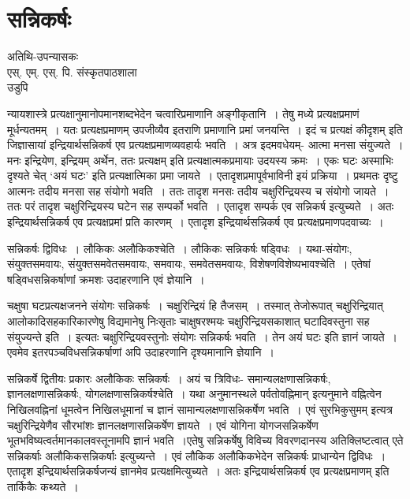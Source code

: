{\fontsize{15}{17}\selectfont
\presetvalues
\chapter{सन्निकर्षः}

\begin{center}
\smallskip
अतिथि-उपन्यासकः\\
एस्. एम्. एस्. पि. संस्कृतपाठशाला\\
उडुपि
\addrule
\end{center} 
न्यायशास्त्रे प्रत्यक्षानुमानोपमानशब्दभेदेन चत्वारिप्रमाणानि अङ्गीकृतानि~। तेषु मध्ये प्रत्यक्ष\-प्रमाणं मूर्धन्यतमम्~। यतः प्रत्यक्षप्रमाणम् उपजीव्यैव इतराणि प्रमाणानि प्रमां जनयन्ति~। इदं च प्रत्यक्षं कीदृशम् इति जिज्ञासायां इन्द्रियार्थसन्निकर्ष एव प्रत्यक्षप्रमाणव्यवहार्यः भवति~। अत्र इदमवधेयम्- आत्मा मनसा संयुज्यते~। मनः इन्द्रियेण, इन्द्रियम् अर्थेन, ततः प्रत्यक्षम् इति प्रत्यक्षात्मकप्रमायाः उदयस्य क्रमः~। एकः घटः अस्माभिः दृश्यते चेत् ‘अयं घटः’ इति प्रत्यक्षात्मिका प्रमा जायते~। एतादृशप्रमापूर्वभाविनी इयं प्रक्रिया~। प्रथमतः दृष्टु आत्मनः तदीय मनसा सह संयोगो भवति~। ततः तादृश मनसः तदीय चक्षुरिन्द्रियस्य च संयोगो जायते~। ततः परं तादृश चक्षुरिन्द्रियस्य घटेन सह सम्पर्को भवति~। एतादृश सम्पर्क एव सन्निकर्ष इत्युच्यते~। अतः इन्द्रियार्थसन्निकर्ष एव प्रत्यक्षप्रमां प्रति कारणम्~। एतादृश इन्द्रियार्थसन्निकर्ष एव प्रत्यक्षप्रमाणपदवाच्यः~। 

सन्निकर्षः द्विविधः~। लौकिकः अलौकिकश्चेति~। लौकिकः सन्निकर्षः षड्विधः~। यथा-संयोगः, संयुक्तसमवायः, संयुक्तसमवेतसमवायः, समवायः, समवेतसमवायः, विशेषण\-विशेष्यभावश्चेति~। एतेषां षड्विधसन्निकर्षाणां क्रमशः उदाहरणानि एवं ज्ञेयानि~। 

चक्षुषा घटप्रत्यक्षजनने संयोगः सन्निकर्षः~। चक्षुरिन्द्रियं हि तैजसम्~। तस्मात् तेजोरूपात् चक्षुरिन्द्रियात् आलोकादिसहकारिकारणेषु विद्यमानेषु निःसृताः चाक्षुषरश्मयः चक्षुरिन्द्रियसकाशात् घटादिवस्तुना सह संयुज्यन्ते इति~। इत्यतः चक्षुरिन्द्रियवस्तुनोः संयोगः सन्निकर्षः भवति~। तेन अयं घटः इति ज्ञानं जायते~। एवमेव इतरपञ्चविधसन्निकर्षाणां अपि उदाहरणानि दृश्यमानानि ज्ञेयानि~।            

सन्निकर्षे द्वितीयः प्रकारः अलौकिकः सन्निकर्षः~। अयं च त्रिविधः- समान्यलक्षणा\-सन्निकर्षः, ज्ञानलक्षणासन्निकर्षः, योगलक्षणासन्निकर्षश्चेति~। यथा अनुमानस्थले पर्वतो\break वह्निमान् इत्यनुमाने वह्नित्वेन निखिलवह्निनां धूमत्वेन निखिलधूमानां च ज्ञानं सामान्यलक्षणासन्निकर्षेण भवति~। एवं सुरभिकुसुमम् इत्यत्र चक्षुरिन्द्रियेणैव सौरभांशः ज्ञानलक्षणासन्निकर्षेण ज्ञायते~। एवं योगिना योगजसन्निकर्षेण भूतभविष्यत्वर्तमानकालवस्तूनामपि ज्ञानं भवति~।\break एतेषु सन्निकर्षेषु विविच्य विवरणदानस्य अतिक्लिष्टत्वात् एते सन्निकर्षाः अलौकिकसन्निकर्षाः इत्युच्यन्ते~। एवं लौकिक अलौकिकभेदेन सन्निकर्षः प्राधान्येन द्विविधः~। एतादृश इन्द्रियार्थसन्निकर्षजन्यं ज्ञानमेव प्रत्यक्षमित्युच्यते~। अतः  इन्द्रियार्थसन्निकर्ष एव प्रत्यक्षप्रमाणम् इति तार्किकैः कथ्यते~। 

\articleend
}
